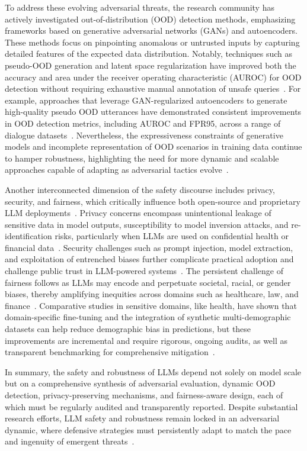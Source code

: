 \documentclass[sigconf]{acmart}
\begin{document}
To address these evolving adversarial threats, the research community has actively investigated out-of-distribution (OOD) detection methods, emphasizing frameworks based on generative adversarial networks (GANs) and autoencoders. These methods focus on pinpointing anomalous or untrusted inputs by capturing detailed features of the expected data distribution. Notably, techniques such as pseudo-OOD generation and latent space regularization have improved both the accuracy and area under the receiver operating characteristic (AUROC) for OOD detection without requiring exhaustive manual annotation of unsafe queries~\cite{ref78,ref82}. For example, approaches that leverage GAN-regularized autoencoders to generate high-quality pseudo OOD utterances have demonstrated consistent improvements in OOD detection metrics, including AUROC and FPR95, across a range of dialogue datasets~\cite{ref78}. Nevertheless, the expressiveness constraints of generative models and incomplete representation of OOD scenarios in training data continue to hamper robustness, highlighting the need for more dynamic and scalable approaches capable of adapting as adversarial tactics evolve~\cite{ref78}.

Another interconnected dimension of the safety discourse includes privacy, security, and fairness, which critically influence both open-source and proprietary LLM deployments~\cite{ref1,ref2,ref10,ref22,ref43,ref44,ref49,ref52,ref53,ref65}. Privacy concerns encompass unintentional leakage of sensitive data in model outputs, susceptibility to model inversion attacks, and re-identification risks, particularly when LLMs are used on confidential health or financial data~\cite{ref1,ref10,ref44}. Security challenges such as prompt injection, model extraction, and exploitation of entrenched biases further complicate practical adoption and challenge public trust in LLM-powered systems~\cite{ref49,ref52,ref53}. The persistent challenge of fairness follows as LLMs may encode and perpetuate societal, racial, or gender biases, thereby amplifying inequities across domains such as healthcare, law, and finance~\cite{ref2,ref22,ref43,ref65}. Comparative studies in sensitive domains, like health, have shown that domain-specific fine-tuning and the integration of synthetic multi-demographic datasets can help reduce demographic bias in predictions, but these improvements are incremental and require rigorous, ongoing audits, as well as transparent benchmarking for comprehensive mitigation~\cite{ref2,ref44,ref65}.

In summary, the safety and robustness of LLMs depend not solely on model scale but on a comprehensive synthesis of adversarial evaluation, dynamic OOD detection, privacy-preserving mechanisms, and fairness-aware design, each of which must be regularly audited and transparently reported. Despite substantial research efforts, LLM safety and robustness remain locked in an adversarial dynamic, where defensive strategies must persistently adapt to match the pace and ingenuity of emergent threats~\cite{ref1,ref43,ref78,ref82}.
\end{document}

